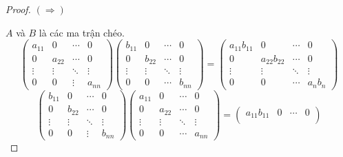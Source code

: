 \documentclass[class=nhvh-linear-algebra,crop=false]{standalone}
\begin{document}
\begin{proof}
    $(\Rightarrow)$
    \par $A$ và $B$ là các ma trận chéo.
    \[
        \begin{pmatrix}
            a_{11} & 0      & \cdots & 0      \\
            0      & a_{22} & \cdots & 0      \\
            \vdots & \vdots & \ddots & \vdots \\
            0      & 0      & \vdots & a_{nn}
        \end{pmatrix}
        \begin{pmatrix}
            b_{11} & 0      & \cdots & 0      \\
            0      & b_{22} & \cdots & 0      \\
            \vdots & \vdots & \ddots & \vdots \\
            0      & 0      & \cdots & b_{nn}
        \end{pmatrix}
        =
        \begin{pmatrix}
            a_{11}b_{11} & 0            & \cdots & 0          \\
            0            & a_{22}b_{22} & \cdots & 0          \\
            \vdots       & \vdots       & \ddots & \vdots     \\
            0            & 0            & \cdots & a_{n}b_{n}
        \end{pmatrix}
    \]
    \[
        \begin{pmatrix}
            b_{11} & 0      & \cdots & 0      \\
            0      & b_{22} & \cdots & 0      \\
            \vdots & \vdots & \ddots & \vdots \\
            0      & 0      & \vdots & b_{nn}
        \end{pmatrix}
        \begin{pmatrix}
            a_{11} & 0      & \cdots & 0      \\
            0      & a_{22} & \cdots & 0      \\
            \vdots & \vdots & \ddots & \vdots \\
            0      & 0      & \cdots & a_{nn}
        \end{pmatrix}
        =
        \begin{pmatrix}
            a_{11}b_{11} & 0            & \cdots & 0          \\

\end{pmatrix}\]
\end{proof}
\end{document}
